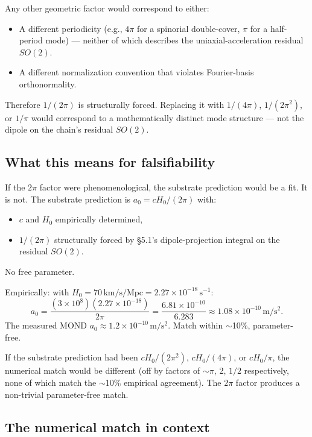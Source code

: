 \documentclass[11pt,a4paper]{article}
\begin{document}
Any other geometric factor would correspond to either:

\begin{itemize}[noitemsep]
\item A different periodicity (e.g., $4\pi$ for a spinorial double-cover, $\pi$ for a half-period mode) --- neither of which describes the uniaxial-acceleration residual $SO(2)$.
\item A different normalization convention that violates Fourier-basis orthonormality.
\end{itemize}

Therefore $1/(2\pi)$ is structurally forced. Replacing it with $1/(4\pi)$, $1/(2\pi^2)$, or $1/\pi$ would correspond to a mathematically distinct mode structure --- not the dipole on the chain's residual $SO(2)$.

\subsection{What this means for falsifiability}

If the $2\pi$ factor were phenomenological, the substrate prediction would be a fit. It is not. The substrate prediction is $a_0 = cH_0/(2\pi)$ with:

\begin{itemize}[noitemsep]
\item $c$ and $H_0$ empirically determined,
\item $1/(2\pi)$ structurally forced by \S5.1's dipole-projection integral on the residual $SO(2)$.
\end{itemize}

No free parameter.

Empirically: with $H_0 = 70\,\mathrm{km/s/Mpc} = 2.27 \times 10^{-18}\,\mathrm{s^{-1}}$:
\[
a_0 = \frac{(3 \times 10^8)(2.27 \times 10^{-18})}{2\pi} = \frac{6.81 \times 10^{-10}}{6.283} \approx 1.08 \times 10^{-10}\,\mathrm{m/s^2}.
\]
The measured MOND $a_0 \approx 1.2 \times 10^{-10}\,\mathrm{m/s^2}$. Match within $\sim$10\%, parameter-free.

If the substrate prediction had been $cH_0/(2\pi^2)$, $cH_0/(4\pi)$, or $cH_0/\pi$, the numerical match would be different (off by factors of $\sim\pi$, 2, $1/2$ respectively, none of which match the $\sim$10\% empirical agreement). The $2\pi$ factor produces a non-trivial parameter-free match.

\subsection{The numerical match in context}
\end{document}
